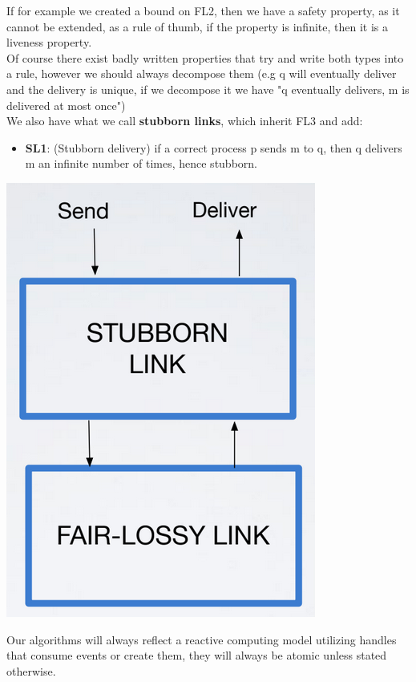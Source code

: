 \documentclass[11pt, a4paper]{article}
\begin{document}
If for example we created a bound on FL2, then we have a safety property, as it cannot be extended, as a rule of thumb, if the property is infinite, then it is a liveness property.\\
Of course there exist badly written properties that try and write both types into a rule, however we should always decompose them (e.g q will eventually deliver and the delivery is unique, if we decompose it we have "q eventually delivers, m is delivered at most once")\\
We also have what we call \textbf{stubborn links}, which inherit FL3 and add:
\begin{itemize}
    \item \textbf{SL1}: (Stubborn delivery) if a correct process p sends m to q, then q delivers m an infinite number of times, hence stubborn.

\end{itemize}
\begin{center}
    \includegraphics[scale=0.5]{img/links/sl.png}
\end{center}
Our algorithms will always reflect a reactive computing model utilizing handles that consume events or create them, they will always be atomic unless stated otherwise.
\end{document}
